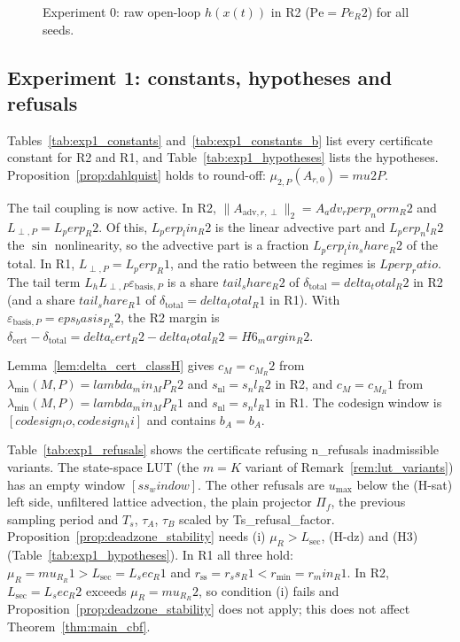 
\begin{figure}[t]\centering{}
\caption{Experiment 0: raw open-loop \(h(x(t))\) in R2 (\(\mathrm{Pe}={{Pe_R2}}\)) for all seeds.}\label{fig:exp0}\end{figure}

\subsection{Experiment 1: constants, hypotheses and refusals}
Tables~\ref{tab:exp1_constants} and~\ref{tab:exp1_constants_b} list every certificate constant for R2 and R1, and
Table~\ref{tab:exp1_hypotheses} lists the hypotheses. Proposition~\ref{prop:dahlquist} holds to round-off:
\(\mu_{2,P}(A_{r,0}) = {{mu2P}}\).

The tail coupling is now active. In R2, \(\|A_{\mathrm{adv},r,\perp}\|_2 = {{A_adv_rperp_norm_R2}}\) and
\(L_{\perp,P} = {{L_perp_R2}}\). Of this, \({{L_perp_lin_R2}}\) is the linear advective part and \({{L_perp_nl_R2}}\)
the \(\sin\) nonlinearity, so the advective part is a fraction \({{L_perp_lin_share_R2}}\) of the total. In R1,
\(L_{\perp,P} = {{L_perp_R1}}\), and the ratio between the regimes is \({{Lperp_ratio}}\). The tail term
\(L_h L_{\perp,P}\varepsilon_{\mathrm{basis},P}\) is a share \({{tail_share_R2}}\) of
\(\delta_{\mathrm{total}} = {{delta_total_R2}}\) in R2 (and a share \({{tail_share_R1}}\) of
\(\delta_{\mathrm{total}} = {{delta_total_R1}}\) in R1). With
\(\varepsilon_{\mathrm{basis},P} = {{eps_basis_P_R2}}\), the R2 margin is
\(\delta_{\mathrm{cert}} - \delta_{\mathrm{total}} = {{delta_cert_R2}} - {{delta_total_R2}} = {{H6_margin_R2}}\).

Lemma~\ref{lem:delta_cert_classH} gives \(c_M = {{c_M_R2}}\) from \(\lambda_{\min}(M,P) = {{lambda_min_MP_R2}}\) and
\(s_{\mathrm{nl}} = {{s_nl_R2}}\) in R2, and \(c_M = {{c_M_R1}}\) from \(\lambda_{\min}(M,P) = {{lambda_min_MP_R1}}\) and
\(s_{\mathrm{nl}} = {{s_nl_R1}}\) in R1. The codesign window is
\([{{codesign_lo}}, {{codesign_hi}}]\) and contains \(b_A = {{b_A}}\).

Table~\ref{tab:exp1_refusals} shows the certificate refusing {{n_refusals}} inadmissible variants. The state-space LUT (the
\(m = K\) variant of Remark~\ref{rem:lut_variants}) has an empty window \([{{ss_window}}]\). The other refusals are
\(u_{\max}\) below the (H-sat) left side, unfiltered lattice advection, the plain projector \(\Pi_f\), the previous
sampling period and \(T_s\), \(\tau_A\), \(\tau_B\) scaled by {{Ts_refusal_factor}}. Proposition~\ref{prop:deadzone_stability} needs (i) \(\mu_R > L_{\mathrm{sec}}\), (H-dz) and (H3)
(Table~\ref{tab:exp1_hypotheses}). In R1 all three hold: \(\mu_R = {{mu_R_R1}} > L_{\mathrm{sec}} = {{L_sec_R1}}\) and
\(r_{\mathrm{ss}} = {{r_ss_R1}} < r_{\min} = {{r_min_R1}}\). In R2, \(L_{\mathrm{sec}} = {{L_sec_R2}}\) exceeds
\(\mu_R = {{mu_R_R2}}\), so condition (i) fails and Proposition~\ref{prop:deadzone_stability} does not apply; this does
not affect Theorem~\ref{thm:main_cbf}.

